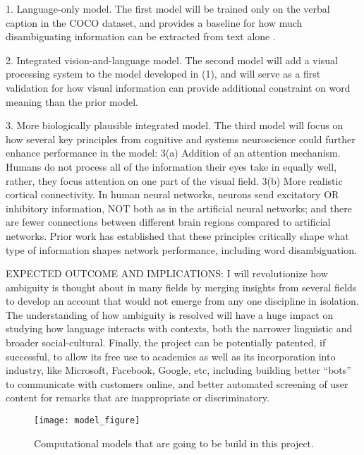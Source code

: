 \documentclass[letterpaper, 12pt]{article}
\begin{document}
1.  Language-only model. The first model will be trained only on the verbal caption in the COCO dataset, and provides a baseline for how much disambiguating information can be extracted from text alone \citep{beekhuizenWhatCompanySemantically2018}.

2.  Integrated vision-and-language model.  The second model will add a visual processing system to the model developed in (1), and will serve as a first validation for how visual information can provide additional constraint on word meaning than the prior model.

3.  More biologically plausible integrated model.  The third model will focus on how several key principles from cognitive and systems neuroscience could further enhance performance in the model: 3(a) Addition of an attention mechanism. Humans do not process all of the information their eyes take in equally well, rather, they focus attention on one part of the visual field. 3(b) More realistic cortical connectivity. In human neural networks, neurons send excitatory OR inhibitory information, NOT both as in the artificial neural networks; and there are fewer connections between different brain regions compared to artificial networks. Prior work \citep{laszloPSPsERPsApplying2014, Armstrong2016Disparatesemanticambiguity} has established that these principles critically shape what type of information shapes network performance, including word disambiguation. 

EXPECTED OUTCOME AND IMPLICATIONS: I will revolutionize how ambiguity is thought about in many fields by merging insights from several fields to develop an account that would not emerge from any one discipline in isolation. The understanding of how ambiguity is resolved will have a huge impact on studying how language interacts with contexts, both the narrower linguistic and broader social-cultural.  Finally, the project can be potentially patented, if successful, to allow its free use to academics as well as its incorporation into industry, like Microsoft, Facebook, Google, etc, including building better “bots” to communicate with customers online, and better automated screening of user content for remarks that are inappropriate or discriminatory.

\begin{figure}[h]
\begin{center}
\texttt{[image: model\_figure]}
\end{center}
    \caption{Computational models that are going to be build in this project.}
\end{figure}

\newpage
% 

\end{document}
